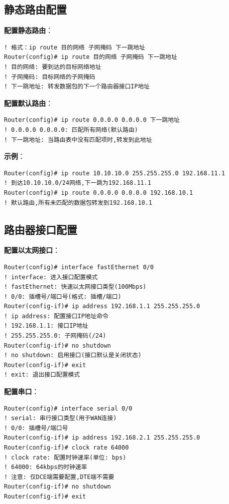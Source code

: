 \documentclass[12pt,a4paper]{ctexart}
\begin{document}
\subsection{静态路由配置}

\begin{cmdbox}
\textbf{配置静态路由}：
\begin{lstlisting}
! 格式：ip route 目的网络 子网掩码 下一跳地址
Router(config)# ip route 目的网络 子网掩码 下一跳地址
! 目的网络: 要到达的目标网络地址
! 子网掩码: 目标网络的子网掩码
! 下一跳地址: 转发数据包的下一个路由器接口IP地址
\end{lstlisting}

\textbf{配置默认路由}：
\begin{lstlisting}
Router(config)# ip route 0.0.0.0 0.0.0.0 下一跳地址
! 0.0.0.0 0.0.0.0: 匹配所有网络(默认路由)
! 下一跳地址: 当路由表中没有匹配项时,转发到此地址
\end{lstlisting}

\textbf{示例}：
\begin{lstlisting}
Router(config)# ip route 10.10.10.0 255.255.255.0 192.168.11.1
! 到达10.10.10.0/24网络,下一跳为192.168.11.1
Router(config)# ip route 0.0.0.0 0.0.0.0 192.168.10.1
! 默认路由,所有未匹配的数据包转发到192.168.10.1
\end{lstlisting}
\end{cmdbox}

\subsection{路由器接口配置}

\begin{cmdbox}
\textbf{配置以太网接口}：
\begin{lstlisting}
Router(config)# interface fastEthernet 0/0
! interface: 进入接口配置模式
! fastEthernet: 快速以太网接口类型(100Mbps)
! 0/0: 插槽号/端口号(格式: 插槽/端口)
Router(config-if)# ip address 192.168.1.1 255.255.255.0
! ip address: 配置接口IP地址命令
! 192.168.1.1: 接口IP地址
! 255.255.255.0: 子网掩码(/24)
Router(config-if)# no shutdown
! no shutdown: 启用接口(接口默认是关闭状态)
Router(config-if)# exit
! exit: 退出接口配置模式
\end{lstlisting}

\textbf{配置串口}：
\begin{lstlisting}
Router(config)# interface serial 0/0
! serial: 串行接口类型(用于WAN连接)
! 0/0: 插槽号/端口号
Router(config-if)# ip address 192.168.2.1 255.255.255.0
Router(config-if)# clock rate 64000
! clock rate: 配置时钟速率(单位: bps)
! 64000: 64kbps的时钟速率
! 注意: 仅DCE端需要配置,DTE端不需要
Router(config-if)# no shutdown
Router(config-if)# exit
\end{lstlisting}
\end{cmdbox}
\end{document}
